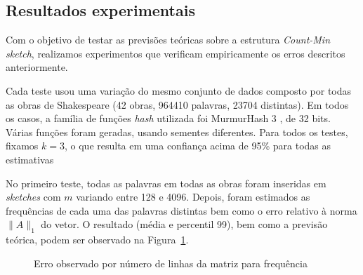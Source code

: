 \subsection{Resultados experimentais}\label{sec:count:experiments}

Com o objetivo de testar as previsões teóricas sobre a estrutura \emph{Count-Min sketch}, realizamos experimentos que verificam empiricamente os erros descritos anteriormente.

Cada teste usou uma variação do mesmo conjunto de dados composto por todas as obras de Shakespeare (42 obras, 964410 palavras, 23704 distintas). Em todos os casos, a família de funções \emph{hash} utilizada foi MurmurHash 3 \cite{appleby2012murmur}, de 32 bits. Várias funções foram geradas, usando sementes diferentes. Para todos os testes, fixamos $k=3$, o que resulta em uma confiança acima de 95\% para todas as estimativas

No primeiro teste, todas as palavras em todas as obras foram inseridas em \emph{sketches} com $m$ variando entre 128 e 4096. Depois, foram estimados as frequências de cada uma das palavras distintas bem como o erro relativo à norma $\lVert A \rVert_1$ do vetor. O resultado (média e percentil 99), bem como a previsão teórica, podem ser observado na Figura~\ref{fig:countmin_result}.

\begin{figure}[!htbp]
\centering
{}
\caption{Erro observado por número de linhas da matriz para frequência}
\label{fig:countmin_result}
\end{figure}

